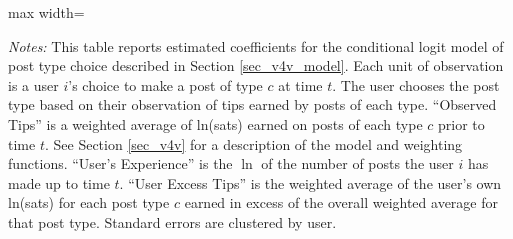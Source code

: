 \begin{table}[H]
\begin{adjustbox}{max width=\textwidth}
\begin{threeparttable}
\begin{tablenotes}[flushleft]
\item \textit{Notes:} This table reports estimated coefficients for the conditional logit model of post type choice described in Section \ref{sec_v4v_model}. Each unit of observation is a user $i$'s choice to make a post of type $c$ at time $t$. The user chooses the post type based on their observation of tips earned by posts of each type. ``Observed Tips'' is a weighted average of ln(sats) earned on posts of each type $c$ prior to time $t$. See Section \ref{sec_v4v} for a description of the model and weighting functions. ``User's Experience'' is the $\ln$ of the number of posts the user $i$ has made up to time $t$. ``User Excess Tips'' is the weighted average of the user's own ln(sats) for each post type $c$ earned in excess of the overall weighted average for that post type. Standard errors are clustered by user.
\end{tablenotes}
\end{threeparttable}
\end{adjustbox}
\end{table}
